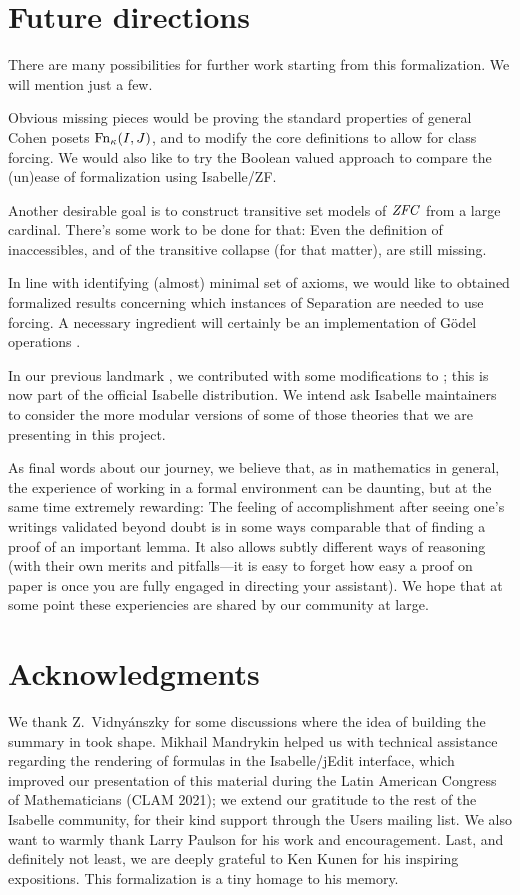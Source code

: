 \section{Future directions}
\label{sec:conclusion}

There are many possibilities for further work starting from this
formalization. We will mention just a few.

Obvious missing pieces would be proving the standard properties of
general Cohen posets $\operatorname{Fn}_\kappa(I,J)$, and to modify the core
definitions to allow for class forcing. We would also like to try the
Boolean valued approach to compare the (un)ease of formalization using
Isabelle/ZF.

Another desirable goal is to construct transitive set models of $\mathit{ZFC}$
from a large cardinal. There's some work to be done for that: Even the
definition of inaccessibles, and of the transitive collapse (for that
matter), are still missing.

In line with identifying (almost) minimal set of axioms, we would like
to obtained formalized results concerning which instances of
Separation are needed to use forcing. A necessary ingredient will
certainly be an implementation of Gödel operations
\cite[Thm.~13.4]{Jech_Millennium}.

In our previous landmark \cite{2020arXiv200109715G}, we contributed
with some modifications to ; this is now
part of the official Isabelle distribution.  We intend ask Isabelle
maintainers to consider the more modular versions of some of those
theories that we are presenting in this project.

As final words about our journey, we believe that, as in mathematics
in general, the experience of working in a formal environment can be
daunting, but at the same time extremely rewarding: The feeling of
accomplishment after seeing one's writings validated beyond doubt is
in some ways comparable that of finding a proof of an important
lemma. It also allows subtly different ways of reasoning (with their
own merits and pitfalls---it is easy to forget how easy a proof on
paper is once you are fully engaged in directing your assistant). We
hope that at some point these experiencies are shared by our community
at large.


\section*{Acknowledgments}
\label{sec:acknowledgments}
We thank Z.~Vidnyánszky for some discussions where the idea of
building the summary in  took shape.
Mikhail Mandrykin helped us with technical assistance regarding the
rendering of formulas in the Isabelle/jEdit interface, which improved
our presentation of this material during the Latin American Congress
of Mathematicians (CLAM 2021); we extend our gratitude to the rest of
the Isabelle community, for their kind support through the Users mailing
list. We also want to warmly thank Larry Paulson for his work and
encouragement.  Last, and definitely not least, we are deeply grateful
to Ken Kunen for his
inspiring expositions. This formalization is a tiny homage to his
memory.


